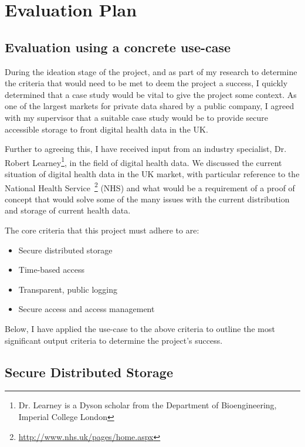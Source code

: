 \section{Evaluation Plan}

\subsection{Evaluation using a concrete use-case}

During the ideation stage of the project, and as part of my research to determine the criteria that would need to be met to deem the project a success, I quickly determined that a case study would be vital to give the project some context. As one of the largest markets for private data shared by a public company, I agreed with my supervisor that a suitable case study would be to provide secure accessible storage to front digital health data in the UK.

Further to agreeing this, I have received input from an industry specialist, Dr. Robert Learney\footnote{Dr. Learney is a Dyson scholar from the Department of Bioengineering, Imperial College London}, in the field of digital health data. We discussed the current situation of digital health data in the UK market, with particular reference to the National Health Service~\footnote{\url{http://www.nhs.uk/pages/home.aspx}} (NHS) and what would be a requirement of a proof of concept that would solve some of the many issues with the current distribution and storage of current health data.

The core criteria that this project must adhere to are:

\begin{itemize}
  \item{
    Secure distributed storage
  }
  \item{
    Time-based access
  }
  \item{
    Transparent, public logging
  }
  \item{
    Secure access and access management
  }
\end{itemize}

Below, I have applied the use-case to the above criteria to outline the most significant output criteria to determine the project's success.

\subsection{Secure Distributed Storage}

